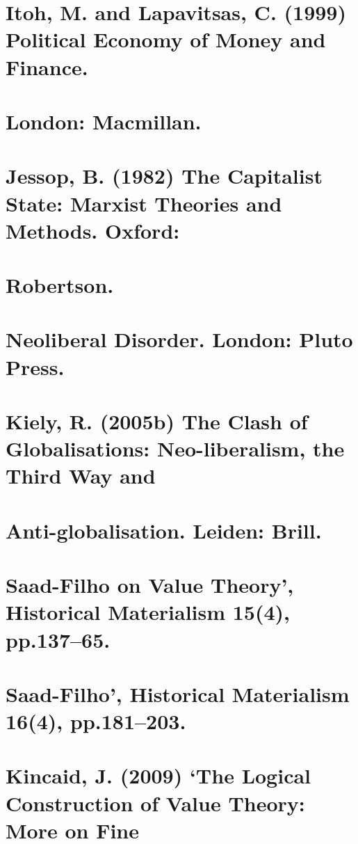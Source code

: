 \section{Itoh, M. and Lapavitsas, C. (1999) Political Economy of Money and Finance.}


\section{London: Macmillan.}


\section{Jessop, B. (1982) The Capitalist State: Marxist Theories and Methods. Oxford:}


\section{Robertson.}


\section{Neoliberal Disorder. London: Pluto Press.}


\section{Kiely, R. (2005b) The Clash of Globalisations: Neo-liberalism, the Third Way and}


\section{Anti-globalisation. Leiden: Brill.}


\section{Saad-Filho on Value Theory’, Historical Materialism 15(4), pp.137–65.}


\section{Saad-Filho’, Historical Materialism 16(4), pp.181–203.}


\section{Kincaid, J. (2009) ‘The Logical Construction of Value Theory: More on Fine}



